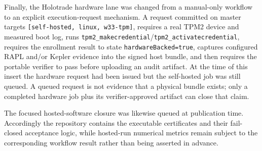 Finally, the Holotrade hardware lane was changed from a manual-only workflow to
an explicit execution-request mechanism.  A request committed on master targets
\texttt{[self-hosted, linux, w33-tpm]}, requires a real TPM2 device and measured
boot log, runs \texttt{tpm2\_makecredential}/\texttt{tpm2\_activatecredential},
requires the enrollment result to state \texttt{hardwareBacked=true}, captures
configured RAPL and/or Kepler evidence into the signed host bundle, and then
requires the portable verifier to pass before uploading an audit artifact.  At
the time of this insert the hardware request had been issued but the self-hosted
job was still queued.  A queued request is not evidence that a physical bundle
exists; only a completed hardware job plus its verifier-approved artifact can
close that claim.

The focused hosted-software closure was likewise queued at publication time.
Accordingly the repository contains the executable certificates and their
fail-closed acceptance logic, while hosted-run numerical metrics remain subject
to the corresponding workflow result rather than being asserted in advance.
